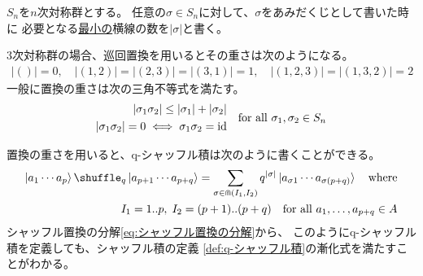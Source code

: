 {	\begin{definition}[置換の重さ]\label{def:置換の重さ} %
		$S_n$を$n$次対称群とする。
		任意の$\sigma\in S_n$に対して、$\sigma$をあみだくじとして書いた時に
		必要となる\underline{最小の}横線の数を$|\sigma|$と書く。
	\end{definition} %

	$3$次対称群の場合、巡回置換を用いるとその重さは次のようになる。
	\begin{equation*}\begin{split}
		|()| = 0,\quad |(1,2)| = |(2,3)| = |(3,1)| = 1
		,\quad |(1,2,3)| = |(1,3,2)| = 2
	\end{split}\end{equation*}
	一般に置換の重さは次の三角不等式を満たす。
	\begin{equation*}\begin{split}
		|\sigma_1\sigma_2|\le |\sigma_1| + |\sigma_2| \\
		|\sigma_1\sigma_2| = 0 \iff \sigma_1\sigma_2 = {\operatorname{id}}
	\end{split}
		\quad\text{for all } \sigma_1,\sigma_2\in S_n
	\end{equation*}

	置換の重さを用いると、q-シャッフル積は次のように書くことができる。
	\begin{equation*}\begin{split}
		\ket{a_1\cdots a_p}\shuffle_q\ket{a_{p+1}\cdots a_{p+q}}
		= \sum_{\sigma\in\Cap(I_1,I_2)} q^{|\sigma|}
		\ket{a_{\sigma 1}\cdots a_{\sigma(p+q)}} \quad\text{where} \\
		I_1 = 1..p,\; I_2 = (p+1)..(p+q)
		\quad\text{for all } a_1,\dots,a_{p+q}\in A
	\end{split}\end{equation*}
	シャッフル置換の分解\eqref{eq:シャッフル置換の分解}から、
	このようにq-シャッフル積を定義しても、シャッフル積の定義
	\ref{def:q-シャッフル積}の漸化式を満たすことがわかる。

}
